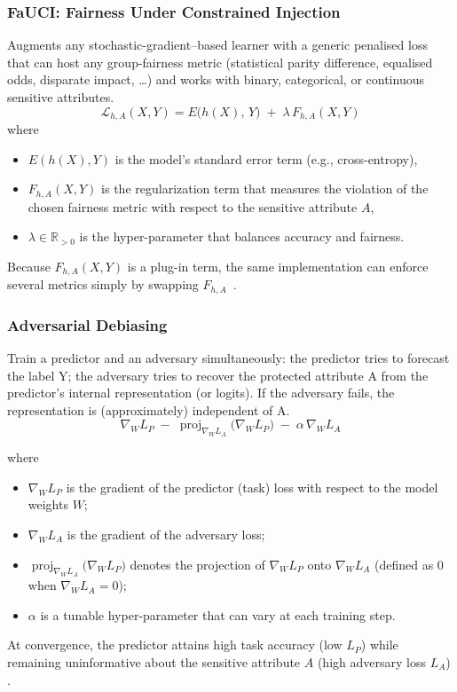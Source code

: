\documentclass[12pt,a4paper,openright,twoside]{book}
\begin{document}
\subsubsection{FaUCI: Fairness Under Constrained Injection} Augments any stochastic-gradient–based learner with a generic penalised loss that can host any group-fairness metric (statistical parity difference, equalised odds, disparate impact, …) and works with binary, categorical, or continuous sensitive attributes.
\begin{equation}
\mathcal{L}_{h,A}(X,Y) = E\!\bigl(h(X),\, Y\bigr) \;+\; \lambda\, F_{h,A}(X,Y)
\end{equation}
where
\begin{itemize}
    \item \(E(h(X),Y)\) is the model’s standard error term (e.g., cross-entropy),
    \item \(F_{h,A}(X,Y)\) is the regularization term that measures the violation of the chosen fairness metric with respect to the sensitive attribute \(A\),
    \item \(\lambda \in \mathbb{R}_{>0}\) is the hyper-parameter that balances accuracy and fairness.
\end{itemize}
Because $F_{h,A}(X,Y)$ is a plug-in term, the same implementation can enforce several metrics simply by swapping $F_{h,A}$~\cite{fauci-aequitas2024}.

\subsubsection{Adversarial Debiasing} Train a predictor and an adversary simultaneously: the predictor tries to forecast the label Y; the adversary tries to recover the protected attribute A from the predictor’s internal representation (or logits). If the adversary fails, the representation is (approximately) independent of A.
\begin{equation}
  \nabla_W L_P
  \;-\;
  \operatorname{proj}_{\nabla_W L_A}\!\bigl(\nabla_W L_P\bigr)
  \;-\;
  \alpha\,\nabla_W L_A
\end{equation}

where
\begin{itemize}
  \item $\nabla_W L_P$ is the gradient of the predictor (task) loss with respect to the model weights $W$;
  \item $\nabla_W L_A$ is the gradient of the adversary loss;
  \item $\operatorname{proj}_{\nabla_W L_A}\!\bigl(\nabla_W L_P\bigr)$ denotes the projection of $\nabla_W L_P$ onto $\nabla_W L_A$ (defined as $0$ when $\nabla_W L_A = 0$);
  \item $\alpha$ is a tunable hyper-parameter that can vary at each training step.
\end{itemize}
At convergence, the predictor attains high task accuracy (low $L_P$) while remaining uninformative about the sensitive attribute $A$ (high adversary loss $L_A$) \cite{zhang2018mitigatingunwantedbiasesadversarial}.
\end{document}
